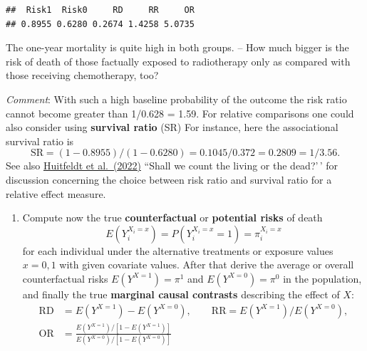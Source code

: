 \documentclass[
]{book}
\newenvironment{Shaded}{\begin{snugshade}}{\end{snugshade}}
\newcommand{\AttributeTok}[1]{\textcolor[rgb]{0.13,0.29,0.53}{#1}}
\newcommand{\DecValTok}[1]{\textcolor[rgb]{0.00,0.00,0.81}{#1}}
\newcommand{\FunctionTok}[1]{\textcolor[rgb]{0.13,0.29,0.53}{\textbf{#1}}}
\newcommand{\NormalTok}[1]{#1}
\newcommand{\OtherTok}[1]{\textcolor[rgb]{0.56,0.35,0.01}{#1}}
\newcommand{\SpecialCharTok}[1]{\textcolor[rgb]{0.81,0.36,0.00}{\textbf{#1}}}
\providecommand{\tightlist}{%
  \setlength{\itemsep}{0pt}\setlength{\parskip}{0pt}}
\theoremstyle{definition}
\theoremstyle{definition}
\theoremstyle{definition}
\theoremstyle{definition}
\theoremstyle{remark}
\begin{document}
\begin{verbatim}
##  Risk1  Risk0     RD     RR     OR 
## 0.8955 0.6280 0.2674 1.4258 5.0735
\end{verbatim}

The one-year mortality is quite high in both groups. -- How much bigger
is the risk of death of those factually exposed to radiotherapy only as
compared with those receiving chemotherapy, too?

\emph{Comment}: With such a high baseline probability of the outcome the risk
ratio cannot become greater than 1/0.628 = 1.59. For relative
comparisons one could also consider using \textbf{survival ratio} (SR) For
instance, here the associational survival ratio is
\[ \text{SR} = (1-0.8955)/(1-0.6280) = 0.1045/0.372 = 0.2809 = 1/3.56 . \]
See also \href{https://doi.org/10.48550/arXiv.2106.06316}{Huitfeldt et al.~(2022)}
``Shall we count the living or the dead?'\,'
for discussion concerning the choice between risk ratio and survival
ratio for a relative effect measure.

\begin{enumerate}
\def\labelenumi{\arabic{enumi}.}
\setcounter{enumi}{1}
\tightlist
\item
  Compute now the true \textbf{counterfactual} or \textbf{potential risks} of
  death \[ E(Y_i^{X_i=x}) = P(Y_i^{X_i=x}=1) = \pi_i^{X_i=x} \] for
  each individual under the alternative treatments or exposure values
  \(x=0,1\) with given covariate values. After that derive the average
  or overall counterfactual risks \(E(Y^{X=1}) = \pi^1\) and
  \(E(Y^{X=0}) = \pi^0\) in the population, and finally the true
  \textbf{marginal causal contrasts} describing the effect of \(X\):
  \[\begin{aligned}
   \text{RD} & = E(Y^{X=1})-E(Y^{X=0}), \qquad  
   \text{RR} = E(Y^{X=1})/E(Y^{X=0}), \\
   \text{OR} & = 
   \frac{E(Y^{X=1})/[1 -  E(Y^{X=1})]}{E(Y^{X=0})/[1 -  E(Y^{X=0})] }
  \end{aligned} \]
\end{enumerate}

\begin{Shaded}
\end{Shaded}
\end{document}
